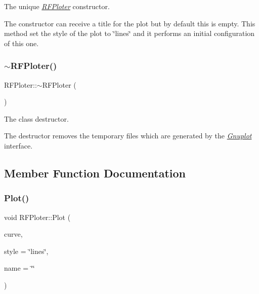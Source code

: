 The unique {\itshape \hyperlink{classRFPloter}{R\+F\+Ploter}} constructor. 

The constructor can receive a title for the plot but by default this is empty. This method set the style of the plot to \char`\"{}lines\char`\"{} and it performs an initial configuration of this one. \mbox{\label{classRFPloter_a773b630723c5fbd6f05173a52de7f35e}} 
\subsubsection{\texorpdfstring{$\sim$\+R\+F\+Ploter()}{~RFPloter()}}
{\footnotesize\ttfamily R\+F\+Ploter\+::$\sim$\+R\+F\+Ploter (\begin{DoxyParamCaption}{ }\end{DoxyParamCaption})\hspace{0.3cm}{\ttfamily [inline]}}



The class destructor. 

The destructor removes the temporary files which are generated by the {\itshape \hyperlink{classGnuplot}{Gnuplot}} interface. 

\subsection{Member Function Documentation}
\mbox{\label{classRFPloter_a8a1c40470c52e8e4522dd0a350ea1aca}} 
\subsubsection{\texorpdfstring{Plot()}{Plot()}}
{\footnotesize\ttfamily void R\+F\+Ploter\+::\+Plot (\begin{DoxyParamCaption}\item[{const \hyperlink{structFreqValues}{Freq\+Values} \&}]{curve,  }\item[{const std\+::string \&}]{style = {\ttfamily \char`\"{}lines\char`\"{}},  }\item[{const std\+::string \&}]{name = {\ttfamily \char`\"{}\char`\"{}} }\end{DoxyParamCaption})\hspace{0.3cm}{\ttfamily [inline]}}



